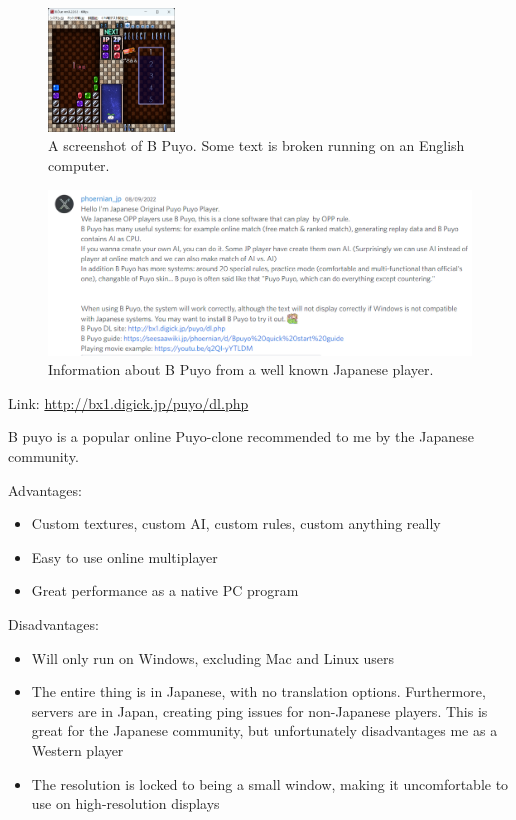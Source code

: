 \documentclass{report}
\begin{document}
\begin{figure}[ht]
\centering
\includegraphics[width=0.3\textwidth]{bpuyo.png}
\caption{\label{fig:bpuyo}A screenshot of B Puyo. Some text is broken running on an English computer.}
\end{figure}
\begin{figure}[ht]
\centering
\includegraphics[width=1\textwidth]{discord.png}
\caption{\label{fig:discord}Information about B Puyo from a well known Japanese player.}
\end{figure}
Link: \href{http://bx1.digick.jp/puyo/dl.php}{http://bx1.digick.jp/puyo/dl.php}

B puyo is a popular online Puyo-clone recommended to me by the Japanese community.
\vspace{0.3cm}

Advantages:

\begin{itemize}
    \renewcommand\labelitemi{--}
    \item Custom textures, custom AI, custom rules, custom anything really
    \item Easy to use online multiplayer
    \item Great performance as a native PC program

\end{itemize}

\vspace{3cm}

Disadvantages: 

\begin{itemize}
    \renewcommand\labelitemi{--}
    \item Will only run on Windows, excluding Mac and Linux users
    \item The entire thing is in Japanese, with no translation options. Furthermore, servers are in Japan, creating ping issues for non-Japanese players. This is great for the Japanese community, but unfortunately disadvantages me as a Western player
    \item The resolution is locked to being a small window, making it uncomfortable to use on high-resolution displays
\end{itemize}
\end{document}

